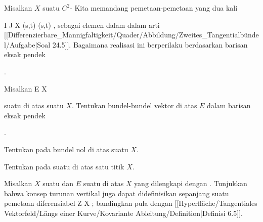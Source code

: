 {}
{

Misalkan $X$ suatu
$C^2$-
Kita memandang pemetaan-pemetaan yang dua kali

\maabbeledisp {\varphi} {I \times J} {X
} {(s,t)} { \varphi(s,t)
} {,}
sebagai elemen dalam
 dalam arti
[[Differenzierbare_Mannigfaltigkeit/Quader/Abbildung/Zweites_Tangentialbündel/Aufgabe|Soal 24.5]].
Bagaimana realisasi ini berperilaku berdasarkan barisan eksak pendek

 { . }

}
{} {}

{}
{

Misalkan
\maabb {} { E } { X
} {}

suatu
di atas suatu
$X$. Tentukan
bundel-bundel vektor di atas $E$ dalam barisan eksak pendek

 { . }

}
{} {}

{}
{

Tentukan
pada bundel nol di atas suatu
$X$.

}
{} {}

{}
{

Tentukan
pada suatu
di atas
satu titik $X$.

}
{} {}

{}
{

Misalkan $X$ suatu
dan $E$ suatu
di atas $X$ yang dilengkapi dengan
. Tunjukkan bahwa konsep turunan vertikal juga dapat didefinisikan sepanjang suatu pemetaan diferensiabel
\maabbdisp {\psi} { Z } { X
} {}
; bandingkan pula dengan
[[Hyperfläche/Tangentiales Vektorfeld/Längs einer Kurve/Kovariante Ableitung/Definition|Definisi 6.5]].

}
{} {}

